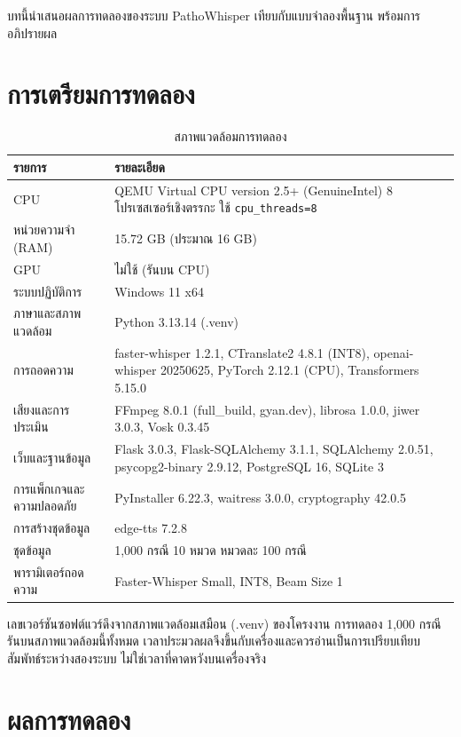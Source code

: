 \providecommand{\todo}[1]{\textbf{[TODO: #1]}}

บทนี้นำเสนอผลการทดลองของระบบ PathoWhisper เทียบกับแบบจำลองพื้นฐาน พร้อมการอภิปรายผล

\section{การเตรียมการทดลอง}

\begin{table}[H]
\centering
\caption{สภาพแวดล้อมการทดลอง}
\label{tab:env}
\small
\begin{tabular}{|p{4.2cm}|p{8.6cm}|}
\hline
\textbf{รายการ} & \textbf{รายละเอียด} \\
\hline
CPU & QEMU Virtual CPU version 2.5+ (GenuineIntel) 8 โปรเซสเซอร์เชิงตรรกะ ใช้ \texttt{cpu\_threads=8} \\
\hline
หน่วยความจำ (RAM) & 15.72 GB (ประมาณ 16 GB) \\
\hline
GPU & ไม่ใช้ (รันบน CPU) \\
\hline
ระบบปฏิบัติการ & Windows 11 x64 \\
\hline
ภาษาและสภาพแวดล้อม & Python 3.13.14 (.venv) \\
\hline
การถอดความ & faster-whisper 1.2.1, CTranslate2 4.8.1 (INT8), openai-whisper 20250625, PyTorch 2.12.1 (CPU), Transformers 5.15.0 \\
\hline
เสียงและการประเมิน & FFmpeg 8.0.1 (full\_build, gyan.dev), librosa 1.0.0, jiwer 3.0.3, Vosk 0.3.45 \\
\hline
เว็บและฐานข้อมูล & Flask 3.0.3, Flask-SQLAlchemy 3.1.1, SQLAlchemy 2.0.51, psycopg2-binary 2.9.12, PostgreSQL 16, SQLite 3 \\
\hline
การแพ็กเกจและความปลอดภัย & PyInstaller 6.22.3, waitress 3.0.0, cryptography 42.0.5 \\
\hline
การสร้างชุดข้อมูล & edge-tts 7.2.8 \\
\hline
ชุดข้อมูล & 1,000 กรณี 10 หมวด หมวดละ 100 กรณี \\
\hline
พารามิเตอร์ถอดความ & Faster-Whisper Small, INT8, Beam Size 1 \\
\hline
\end{tabular}
\end{table}

\noindent เลขเวอร์ชันซอฟต์แวร์ดึงจากสภาพแวดล้อมเสมือน (.venv) ของโครงงาน การทดลอง 1,000 กรณีรันบนสภาพแวดล้อมนี้ทั้งหมด เวลาประมวลผลจึงขึ้นกับเครื่องและควรอ่านเป็นการเปรียบเทียบสัมพัทธ์ระหว่างสองระบบ ไม่ใช่เวลาที่คาดหวังบนเครื่องจริง

\section{ผลการทดลอง}

